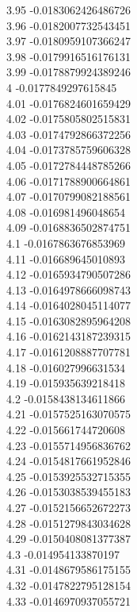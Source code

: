 {3.95	-0.0183062426486726\\
3.96	-0.0182007732543451\\
3.97	-0.0180959107366247\\
3.98	-0.0179916516176131\\
3.99	-0.0178879924389246\\
4	-0.0177849297615845\\
4.01	-0.0176824601659429\\
4.02	-0.0175805802515831\\
4.03	-0.0174792866372256\\
4.04	-0.0173785759606328\\
4.05	-0.0172784448785266\\
4.06	-0.0171788900664861\\
4.07	-0.0170799082188561\\
4.08	-0.016981496048654\\
4.09	-0.0168836502874751\\
4.1	-0.0167863676853969\\
4.11	-0.016689645010893\\
4.12	-0.0165934790507286\\
4.13	-0.0164978666098743\\
4.14	-0.0164028045114077\\
4.15	-0.0163082895964208\\
4.16	-0.0162143187239315\\
4.17	-0.0161208887707781\\
4.18	-0.016027996631534\\
4.19	-0.015935639218418\\
4.2	-0.0158438134611866\\
4.21	-0.0157525163070575\\
4.22	-0.015661744720608\\
4.23	-0.0155714956836762\\
4.24	-0.0154817661952846\\
4.25	-0.0153925532715355\\
4.26	-0.0153038539455183\\
4.27	-0.0152156652672273\\
4.28	-0.0151279843034628\\
4.29	-0.0150408081377387\\
4.3	-0.014954133870197\\
4.31	-0.0148679586175155\\
4.32	-0.0147822795128154\\
4.33	-0.0146970937055721\\
}
